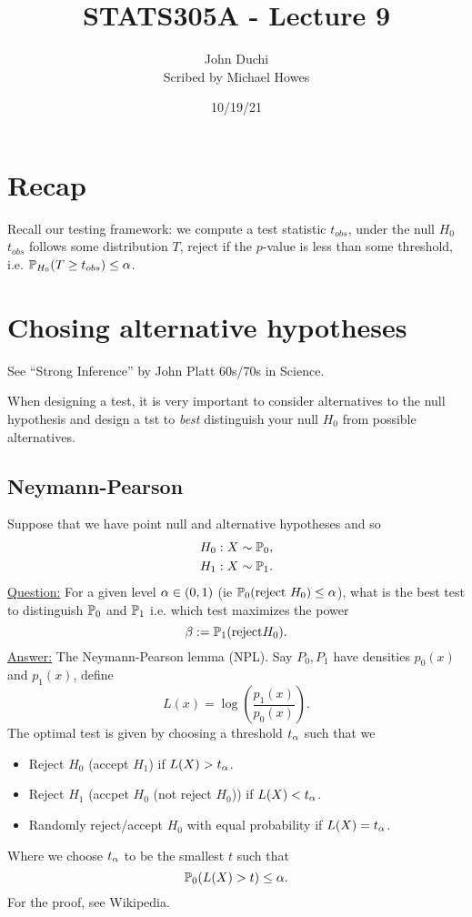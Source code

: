 




\title{STATS305A - Lecture 9}
\author{John Duchi\\ Scribed by Michael Howes}
\date{10/19/21}

\pagestyle{fancy}
\fancyhf{}


\maketitle
\tableofcontents
\section{Recap}
Recall our testing framework: we compute a test statistic $t_{obs}$, under the null $H_0$ $t_{obs}$ follows some distribution $T$, reject if the $p$-value is less than some threshold, i.e. ${\mathbb{P}}_{H_0}(T \ge t_{obs}) \le {\alpha}$.
\section{Chosing alternative hypotheses}
See ``Strong Inference'' by John Platt 60s/70s in Science. 

When designing a test, it is very important to consider alternatives to the null hypothesis and design a tst to \emph{best} distinguish your null $H_0$ from possible alternatives.

\subsection{Neymann-Pearson}
Suppose that we have point null and alternative hypotheses and so 
\begin{align*}
    H_0&:X \sim {\mathbb{P}}_0,\\
    H_1&:X \sim {\mathbb{P}}_1.
\end{align*}
\underline{Question:} For a given level ${\alpha} \in (0,1)$ (ie ${\mathbb{P}}_0(\text{reject }H_0) \le {\alpha}$), what is the best test to distinguish ${\mathbb{P}}_0$ and ${\mathbb{P}}_1$ i.e. which test maximizes the power
\[\beta := {\mathbb{P}}_1(\text{reject} H_0). \]
\underline{Answer:} The Neymann-Pearson lemma (NPL). Say $P_0, P_1$ have densities $p_0(x)$ and $p_1(x)$, define
\[L(x) = \log\left(\frac{p_1(x)}{p_0(x)}\right). \]
The optimal test is given by choosing a threshold $t_{\alpha}$ such that we 
\begin{itemize}
    \item Reject $H_0$ (accept $H_1$) if $L(X) > t_{\alpha}$.
    \item Reject $H_1$ (accpet $H_0$ (not reject $H_0$)) if $L(X) < t_{\alpha}$.
    \item Randomly reject/accept $H_0$ with equal probability if $L(X) = t_{\alpha}$.
\end{itemize}
Where we choose $t_{\alpha}$ to be the smallest $t$ such that 
\[{\mathbb{P}}_0(L(X) >t) \le {\alpha}. \]
For the proof, see Wikipedia. 

